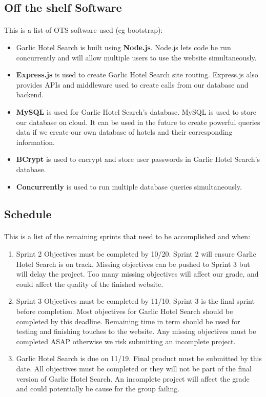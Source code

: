 \documentclass[]{article}
\begin{document}
\subsection{Off the shelf Software}
\paragraph{}
This is a list of OTS software used (eg bootstrap):
\begin{itemize}
    \item Garlic Hotel Search is built using \textbf{Node.js}. Node.js lets code be run concurrently and will allow multiple users to use the website simultaneously.
    \item \textbf{Express.js} is used to create Garlic Hotel Search site routing. Express.js also provides APIs and middleware used to create calls from our database and backend.
    \item  \textbf{MySQL} is used for Garlic Hotel Search’s database. MySQL is used to store our database on cloud. It can be used in the future to create powerful queries data if we create our own database of hotels and their corresponding information.
    \item \textbf{BCrypt} is used to encrypt and store user passwords in Garlic Hotel Search’s database.
    \item \textbf{Concurrently} is used to run multiple database queries simultaneously.
\end{itemize}

\subsection{Schedule}
\paragraph{}
This is a list of the remaining sprints that need to be accomplished and when:

\begin{enumerate}
    \item Sprint 2 Objectives must be completed by 10/20. Sprint 2 will ensure Garlic Hotel Search is on track. Missing objectives can be pushed to Sprint 3 but will delay the project. Too many missing objectives will affect our grade, and could affect the quality of the finished website. 
    \item Sprint 3 Objectives must be completed by 11/10. Sprint 3 is the final sprint before completion. Most objectives for Garlic Hotel Search should be completed by this deadline. Remaining time in term should be used for testing and finishing touches to the website. Any missing objectives must be completed ASAP otherwise we risk submitting an incomplete project.
    \item Garlic Hotel Search is due on 11/19. Final product must be submitted by this date. All objectives must be completed or they will not be part of the final version of Garlic Hotel Search. An incomplete project will affect the grade and could potentially be cause for the group failing.
\end{enumerate}
\end{document}
